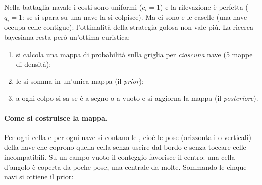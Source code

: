 Nella battaglia navale i costi sono uniformi ($c_i = 1$) e la rilevazione è perfetta
($q_i = 1$: se si spara su una nave la si colpisce). Ma ci sono  e le
caselle  (una nave occupa celle contigue): l'ottimalità della
strategia golosa non vale più. La ricerca bayesiana resta però un'ottima euristica:
\begin{enumerate}
  \item si calcola una mappa di probabilità sulla griglia per \emph{ciascuna} nave
        (5 mappe di densità);
  \item le si somma in un'unica mappa (il \emph{prior});
  \item a ogni colpo si sa se è a segno o a vuoto e si aggiorna la mappa (il \emph{posteriore}).
\end{enumerate}

\paragraph{Come si costruisce la mappa.}
Per ogni cella e per ogni nave  si contano le , cioè le pose (orizzontali o verticali) della nave che coprono quella cella senza
uscire dal bordo e senza toccare celle incompatibili. Su un campo vuoto il conteggio
favorisce il centro: una cella d'angolo è coperta da poche pose, una centrale da molte.
Sommando le cinque navi si ottiene il prior:

